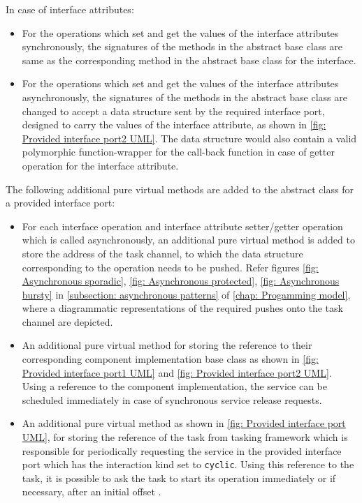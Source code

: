 \newpage
In case of interface attributes:
\begin{itemize}
\item For the operations which set and get the values of the interface attributes synchronously, the signatures of the methods in the abstract base class are same as the corresponding method in the abstract base class for the interface.
\item For the operations which set and get the values of the interface attributes asynchronously, the signatures of the methods in the abstract base class are changed to accept a data structure sent by the required interface port, designed to carry the values of the interface attribute, as shown in \cref{fig: Provided interface port2 UML}. The data structure would also contain a valid polymorphic function-wrapper for the call-back function in case of getter operation for the interface attribute.  
\end{itemize}

The following additional pure virtual methods are added to the abstract class for a provided interface port:
\begin{itemize}
\item For each interface operation and interface attribute setter/getter operation which is called asynchronously, an additional pure virtual method is added to store the address of the task channel, to which the data structure corresponding to the operation needs to be pushed. Refer figures \cref{fig: Asynchronous sporadic}, \cref{fig: Asynchronous protected}, \cref{fig: Asynchronous bursty} in \cref{subsection: asynchronous patterns} of \cref{chap: Progamming model}, where a diagrammatic representations of the required pushes onto the task channel are depicted. 
\item An additional pure virtual method for storing the reference to their corresponding component implementation base class as shown in \cref{fig: Provided interface port1 UML} and \cref{fig: Provided interface port2 UML}. Using a reference to the component implementation, the service can be scheduled immediately in case of synchronous service release requests. 
\item An additional pure virtual method as shown in \cref{fig: Provided interface port UML}, for storing the reference of the task from tasking framework which is responsible for periodically requesting the service in the provided interface port which has the interaction kind set to \texttt{cyclic}. Using this reference to the task, it is possible to ask the task to start its operation immediately or if necessary, after an initial offset \cite{CompBasedProcess}. 
\end{itemize}

